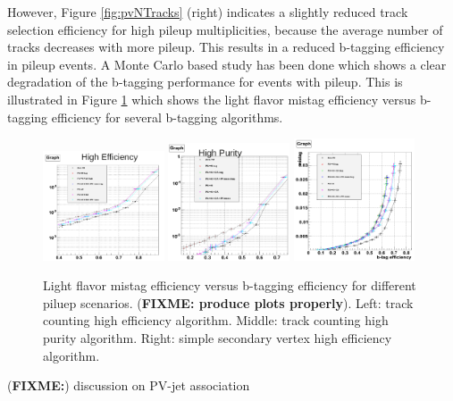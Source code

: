 However, Figure \ref{fig:pvNTracks} (right) indicates a slightly reduced track selection efficiency for high pileup multiplicities, because the average number of tracks decreases with more pileup. This results in a reduced b-tagging efficiency in pileup events.
A Monte Carlo based study has been done which shows a clear degradation of the b-tagging performance for events with pileup. This is illustrated in Figure \ref{fig:pileupBTagPerformance} which shows the light flavor mistag efficiency versus b-tagging efficiency for several b-tagging algorithms.

\begin{figure}[h!]
\centering
\includegraphics[width=0.32\textwidth]{figures/pileupPerfTCHE.png}
\includegraphics[width=0.32\textwidth]{figures/pileupPerfTCHP.png}
\includegraphics[width=0.32\textwidth]{figures/pileupPerfSSV.png}
\caption{Light flavor mistag efficiency versus b-tagging efficiency for different piluep scenarios. ({\bf FIXME: produce plots properly}). Left: track counting high efficiency algorithm. Middle: track counting high purity algorithm. Right: simple secondary vertex high efficiency algorithm. }
\label{fig:pileupBTagPerformance}
\end{figure}


({\bf FIXME:})    discussion on PV-jet association
